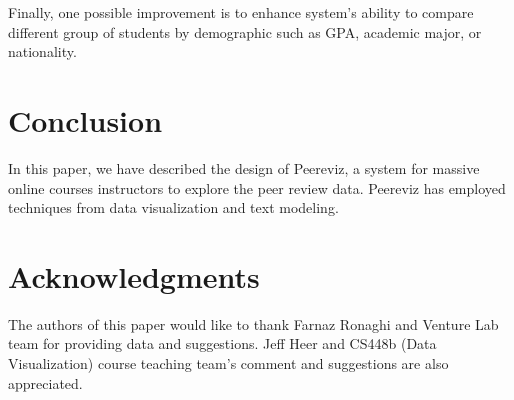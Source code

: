 \documentclass{sigchi}
\begin{document}
Finally, one possible improvement is to enhance system’s ability to compare
different group of students by demographic such as GPA, academic major, or
nationality.


\section{Conclusion}

In this paper, we have described the design of Peereviz, a system for massive online courses
instructors to explore the peer review data.   Peereviz has employed techniques
from data visualization and text modeling.

\section{Acknowledgments}
The authors of this paper would like to thank Farnaz Ronaghi and Venture Lab
team for providing data and suggestions.
Jeff Heer and CS448b (Data Visualization) course teaching team's comment
and suggestions are also appreciated.

%
%
%
%
%



\end{document}
